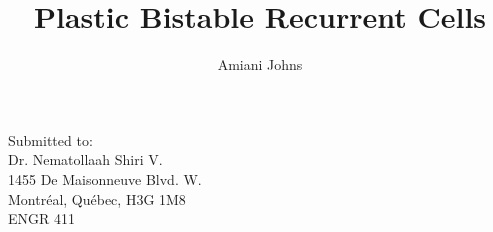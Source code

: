 \documentclass[12pt]{article}
\title{Plastic Bistable Recurrent Cells}
\author{Amiani Johns}
\begin{document}
\maketitle
\thispagestyle{empty}
\begin{center}
Submitted to:\\
Dr. Nematollaah Shiri V.\\
1455 De Maisonneuve Blvd. W.\\
Montréal, Québec, H3G 1M8\\
ENGR 411
\end{center}

\doublespacing


\clearpage



\clearpage



\clearpage


\end{document}
